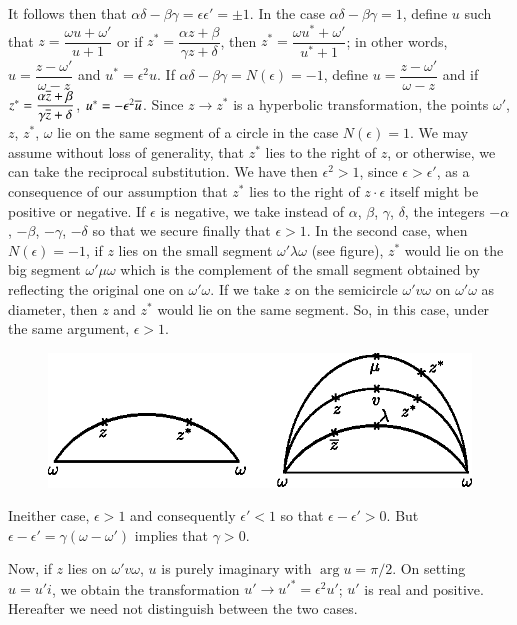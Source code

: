 It follows then that $\alpha\delta-\beta\gamma=\epsilon\epsilon'=\pm
1$. In the case $\alpha\delta-\beta\gamma=1$, define $u$ such that
$z=\dfrac{\omega u+\omega'}{u+1}$ or if $z^{\ast}=\dfrac{\alpha
  z+\beta}{\gamma z+\delta}$, then $z^{\ast}=\dfrac{\omega
  u^{\ast}+\omega'}{u^{\ast}+1}$; in other words,
$u=\dfrac{z-\omega'}{\omega-z}$ and $u^{\ast}=\epsilon^{2}u$. If
$\alpha\delta-\beta\gamma=N(\epsilon)=-1$, define
$u=\dfrac{z-\omega'}{\omega-z}$ and if
$z^{\ast}=\dfrac{\alpha\overline{z}+\beta}{\gamma\overline{z}+\delta}$,
$u^{\ast}=-\epsilon^{2}\overline{u}$. Since $z\to z^{\ast}$ is a hyperbolic
transformation, the points $\omega'$, $z$, $z^{\ast}$, $\omega$ lie on
the same segment of a circle in the case $N(\epsilon)=1$. We may
assume without loss of generality, that $z^{\ast}$ lies to the right
of $z$, or otherwise, we can take the reciprocal substitution. We have
then $\epsilon^{2}>1$, since $\epsilon>\epsilon'$, as a consequence of
our assumption that $z^{\ast}$ lies to the right of $z\cdot \epsilon$
itself might be positive or negative. If $\epsilon$ is negative, we
take instead of $\alpha$, $\beta$, $\gamma$, $\delta$, the integers
$-\alpha$, $-\beta$, $-\gamma$, $-\delta$ so that we secure finally
that $\epsilon>1$. In the second case, when $N(\epsilon)=-1$, if $z$
lies on the small segment $\omega'\lambda\omega$ (see figure),
$z^{\ast}$ would lie on the big segment $\omega'\mu\omega$ which is
the complement of the small segment obtained by reflecting the
original one on $\omega'\omega$. If we take $z$ on the semicircle
$\omega'v\omega$ on $\omega'\omega$ as diameter, then $z$ and
$z^{\ast}$ would lie on the same segment. So, in this case, under the
same argument, $\epsilon>1$.
\begin{figure}[H]
\centering
\includegraphics{fig3.eps}
\end{figure}

In\pageoriginale either case, $\epsilon>1$ and consequently
$\epsilon'<1$ so that $\epsilon-\epsilon'>0$. But
$\epsilon-\epsilon'=\gamma(\omega-\omega')$ implies that $\gamma>0$.

Now, if $z$ lies on $\omega'v\omega$, $u$ is purely imaginary with
$\arg u=\pi/2$. On setting $u=u'i$, we obtain the transformation
$u'\to {u'}^{\ast}=\epsilon^{2}u'$; $u'$ is real and
positive. Hereafter we need not distinguish between the two cases.

